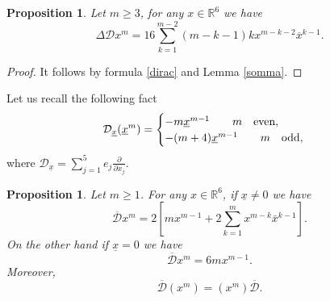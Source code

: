 \documentclass[reqno,11pt]{amsart}
\numberwithin{equation}{section}
\newtheorem{proposition}[theorem]{Proposition}
\theoremstyle{definition}
\begin{document}
\begin{proposition}\label{dirac_laplacian}
Let $m\geq 3$, for any $x\in\mathbb R^6$ we have
$$ \Delta \mathcal{D}x^m=16\sum_{k=1}^{m-2}(m-k-1)k x^{m-k-2} \overline x^{k-1}.$$
\end{proposition}
\begin{proof}
It follows by formula \eqref{dirac} and Lemma \ref{somma}.
\end{proof}
Let us recall the following fact
\begin{equation}
\label{l1}
\mathcal{D}_{\underline{x}}(\underline{x}^m)= \begin{cases}
-m \underline{x}^{m-1} \qquad m \quad \hbox{even},\\
-(m+4) \underline{x}^{m-1} \qquad m \quad \hbox{odd},
\end{cases}
\end{equation}
where $ \mathcal{D}_{\underline{x}}= \sum_{j=1}^5 e_j\frac{\partial}{\partial x_j}$.
\begin{proposition}
\label{l6}
Let $ m \geq 1$. For any $x \in \mathbb{R}^6$, if $ \underline{x} \neq 0$ we have
\begin{equation}
\label{l9}
\mathcal{\overline{D}}x^m=2 \left[mx^{m-1}+2 \sum_{k=1}^m x^{m-k} \bar{x}^{k-1}\right].
\end{equation}
On the other hand if $ \underline{x}=0$ we have
$$ \mathcal{\overline{D}}x^m=6mx^{m-1}.$$
Moreover,
$$ \mathcal{\overline{D}}(x^m)=(x^m) \mathcal{\overline{D}}.$$
\end{proposition}
\end{document}
